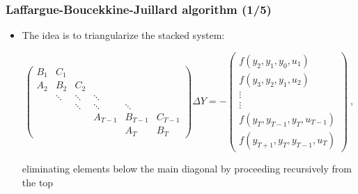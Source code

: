 \documentclass[handout,usepdftitle=false,xcolor=dvipsnames,aspectratio=169]{beamer}
\begin{document}
\begin{frame}
  \frametitle{Laffargue-Boucekkine-Juillard algorithm (1/5)}
  \begin{itemize}
    \item  The idea is to triangularize the stacked system:
          \begin{small}
            \begin{equation}
              \begin{pmatrix}
                B_1 & C_1    &        &         &         &         \\
                A_2 & B_2    & C_2    &         &         &         \\
                    & \ddots & \ddots & \ddots  &         &         \\
                    &        & \ddots & \ddots  & \ddots  &         \\
                    &        &        & A_{T-1} & B_{T-1} & C_{T-1} \\
                    &        &        &         & A_T     & B_T
              \end{pmatrix}
              \Delta Y
              =
              -\begin{pmatrix}
                f(y_2,y_1,y_0,u_1)             \\
                f(y_3,y_2,y_1,u_2)             \\
                \vdots                         \\
                \vdots                         \\
                f(y_{T},y_{T-1},y_{T},u_{T-1}) \\
                f(y_{T+1},y_T,y_{T-1},u_T)
              \end{pmatrix} \: ,
            \end{equation}
          \end{small}
          eliminating elements below the main diagonal by proceeding recursively from the top
  \end{itemize}
\end{frame}
\end{document}
